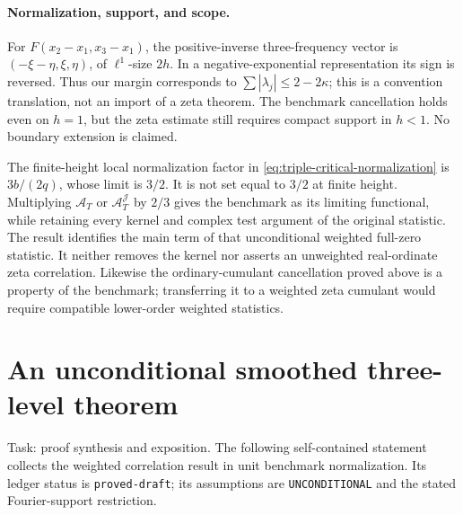 \documentclass[11pt]{article}
\begin{document}
\paragraph{Normalization, support, and scope.}
For \(F(x_2-x_1,x_3-x_1)\), the positive-inverse three-frequency vector is
\((-\xi-\eta,\xi,\eta)\), of \(\ell^1\)-size \(2h\). In a
negative-exponential representation its sign is reversed. Thus our
margin corresponds to \(\sum|\lambda_j|\leq2-2\kappa\); this is a
convention translation, not an import of a zeta theorem. The benchmark
cancellation holds even on \(h=1\), but the zeta estimate still requires
compact support in \(h<1\). No boundary extension is claimed.

The finite-height local normalization factor in
\eqref{eq:triple-critical-normalization} is \(3b/(2q)\), whose limit is
\(3/2\). It is not set equal to \(3/2\) at finite height. Multiplying
\(\mathcal A_T\) or \(\mathcal A_T^{\mathcal J}\) by \(2/3\) gives the
benchmark as its limiting functional, while retaining every kernel and
complex test argument of the original statistic. The result identifies
the main term of that unconditional weighted full-zero statistic. It
neither removes the kernel nor asserts an unweighted real-ordinate zeta
correlation. Likewise the ordinary-cumulant cancellation proved above
is a property of the benchmark; transferring it to a weighted zeta
cumulant would require compatible lower-order weighted statistics.


\section{An unconditional smoothed three-level theorem}

Task: proof synthesis and exposition. The following self-contained
statement collects the weighted correlation result in unit benchmark
normalization. Its ledger status is \texttt{proved-draft}; its assumptions
are \texttt{UNCONDITIONAL} and the stated Fourier-support restriction.
\end{document}
